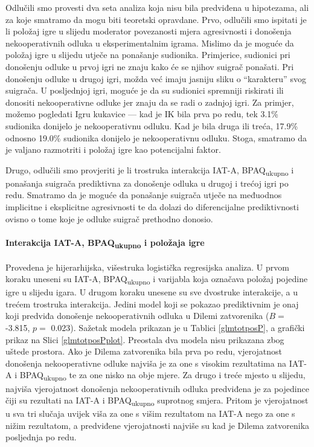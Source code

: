 \documentclass[a4paper, 12pt]{report}
\begin{document}
Odlučili smo provesti dva seta analiza koja nisu bila predviđena u hipotezama,
ali za koje smatramo da mogu biti teoretski opravdane. Prvo, odlučili smo
ispitati je li položaj igre u slijedu moderator povezanosti mjera agresivnosti i
donošenja nekooperativnih odluka u eksperimentalnim igrama. Mislimo da je moguće
da položaj igre u slijedu utječe na ponašanje sudionika. Primjerice, sudionici 
pri donošenju odluke u prvoj igri ne znaju kako će se njihov suigrač ponašati.
Pri donošenju odluke u drugoj igri, možda već imaju jasniju sliku o
\enquote{karakteru} svog suigrača. U posljednjoj igri, moguće je da su sudionici
spremniji riskirati ili donositi nekooperativne odluke jer znaju da se radi o
zadnjoj igri. Za primjer, možemo pogledati Igru kukavice --- kad je IK bila prva
po redu, tek 3.1\% sudionika donijelo je nekooperativnu odluku. Kad je bila
druga ili treća, 17.9\% odnosno 19.0\% sudionika donijelo je nekooperativnu
odluku. Stoga, smatramo da je valjano razmotriti i položaj igre kao
potencijalni faktor. 

Drugo, odlučili smo provjeriti je li trostruka interakcija
IAT-A, BPAQ\textsubscript{ukupno} i ponašanja suigrača prediktivna za donošenje
odluka u drugoj i trećoj igri po redu. Smatramo da je moguće da ponašanje suigrača
utječe na međuodnos implicitne i eksplicitne agresivnosti te da dolazi do
diferencijalne prediktivnosti ovisno o tome koje je odluke suigrač prethodno
donosio. 

\paragraph{Interakcija IAT-A, BPAQ\textsubscript{ukupno} i položaja igre} 
Provedena je hijerarhijska, višestruka logistička regresijska analiza. U prvom
koraku uneseni su IAT-A, BPAQ\textsubscript{ukupno} i varijabla koja označava
položaj pojedine igre u slijedu igara. U drugom koraku unesene su sve dvostruke
interakcije, a u trećem trostruka interakcija.
Jedini model koji se pokazao prediktivnim je onaj koji predviđa donošenje
nekooperativnih odluka u Dilemi zatvorenika 
($B =$ -3.815, $p =$ 0.023). Sažetak modela prikazan je u Tablici
\ref{glmtotposP}, a grafički prikaz na Slici \ref{glmtotposPplot}. Preostala
dva modela nisu prikazana zbog  uštede prostora.
Ako je Dilema zatvorenika bila prva po redu, vjerojatnost donošenja nekooperativne odluke
najviša je za one s visokim rezultatima na IAT-A i BPAQ\textsubscript{ukupno}
te za one nisko na obje mjere. Za drugo i treće mjesto u slijedu,
najviša vjerojatnost donošenja nekooperativnih odluka predviđena je za pojedince
čiji su rezultati na IAT-A i BPAQ\textsubscript{ukupno} suprotnog
smjera. Pritom je vjerojatnost u sva tri slučaja uvijek viša za one s višim
rezultatom na IAT-A nego za one s nižim rezultatom, a predviđene vjerojatnosti
najviše su kad je Dilema zatvorenika posljednja po redu.
\end{document}
